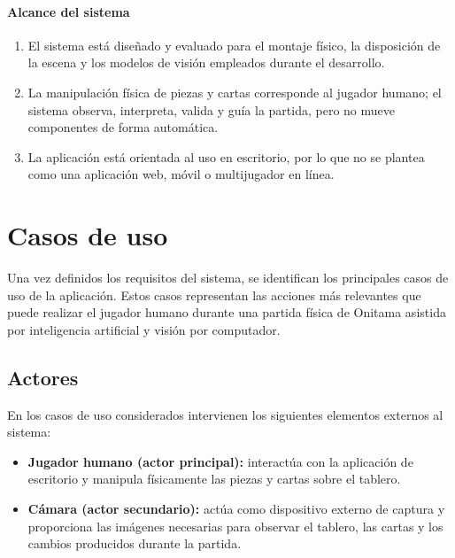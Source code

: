 \paragraph{Alcance del sistema}

\begin{enumerate}[label=\textbf{RS-\twodigits*:}, leftmargin=2.2cm, resume]
    \item El sistema está diseñado y evaluado para el montaje físico, la disposición de la escena y los modelos de visión empleados durante el desarrollo.

    \item La manipulación física de piezas y cartas corresponde al jugador humano; el sistema observa, interpreta, valida y guía la partida, pero no mueve componentes de forma automática.

    \item La aplicación está orientada al uso en escritorio, por lo que no se plantea como una aplicación web, móvil o multijugador en línea.
\end{enumerate}


\section{Casos de uso}
\label{sec:casos-uso}

Una vez definidos los requisitos del sistema, se identifican los principales casos de uso de la aplicación. Estos casos representan las acciones más relevantes que puede realizar el jugador humano durante una partida física de Onitama asistida por inteligencia artificial y visión por computador.

\subsection*{Actores}

En los casos de uso considerados intervienen los siguientes elementos externos al sistema:

\begin{itemize}
    \item \textbf{Jugador humano (actor principal):} interactúa con la aplicación de escritorio y manipula físicamente las piezas y cartas sobre el tablero.

    \item \textbf{Cámara (actor secundario):} actúa como dispositivo externo de captura y proporciona las imágenes necesarias para observar el tablero, las cartas y los cambios producidos durante la partida.
\end{itemize}

